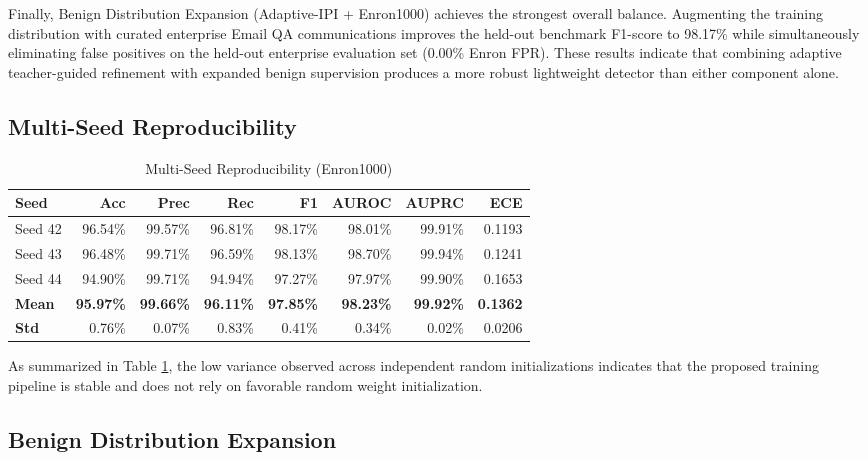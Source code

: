 \documentclass[conference]{IEEEtran}
\begin{document}
Finally, Benign Distribution Expansion (Adaptive-IPI + Enron1000) achieves the strongest overall balance. Augmenting the training distribution with curated enterprise Email QA communications improves the held-out benchmark F1-score to 98.17\% while simultaneously eliminating false positives on the held-out enterprise evaluation set (0.00\% Enron FPR). These results indicate that combining adaptive teacher-guided refinement with expanded benign supervision produces a more robust lightweight detector than either component alone.

\subsection{Multi-Seed Reproducibility}

\begin{table}[tb]
\centering
\caption{Multi-Seed Reproducibility (Enron1000)}
\label{tab:table3}
\begin{tabular}{lrrrrrrr}
\toprule
\textbf{Seed} & \textbf{Acc} & \textbf{Prec} & \textbf{Rec} & \textbf{F1} & \textbf{AUROC} & \textbf{AUPRC} & \textbf{ECE} \\
\midrule
Seed 42 & 96.54\% & 99.57\% & 96.81\% & 98.17\% & 98.01\% & 99.91\% & 0.1193 \\
Seed 43 & 96.48\% & 99.71\% & 96.59\% & 98.13\% & 98.70\% & 99.94\% & 0.1241 \\
Seed 44 & 94.90\% & 99.71\% & 94.94\% & 97.27\% & 97.97\% & 99.90\% & 0.1653 \\
\textbf{Mean} & \textbf{95.97\%} & \textbf{99.66\%} & \textbf{96.11\%} & \textbf{97.85\%} & \textbf{98.23\%} & \textbf{99.92\%} & \textbf{0.1362} \\
\textbf{Std} & 0.76\% & 0.07\% & 0.83\% & 0.41\% & 0.34\% & 0.02\% & 0.0206 \\
\bottomrule
\end{tabular}
\end{table}

As summarized in Table \ref{tab:table3}, the low variance observed across independent random initializations indicates that the proposed training pipeline is stable and does not rely on favorable random weight initialization.

\subsection{Benign Distribution Expansion}
\end{document}
